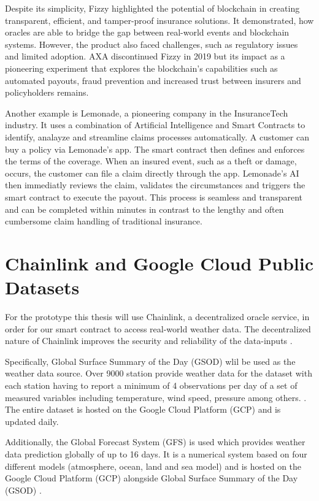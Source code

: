  Despite its simplicity, Fizzy highlighted the potential of blockchain in creating transparent, efficient, and tamper-proof insurance solutions. It demonstrated, how oracles are able to bridge the gap between real-world events and blockchain systems. However, the product also faced challenges, such as regulatory issues and limited adoption. AXA discontinued Fizzy in 2019 but its impact as a pioneering experiment that explores the blockchain's capabilities such as automated payouts, fraud prevention and increased trust between insurers and policyholders remains. \autocite{sedkaoui2021blockchain}

Another example is Lemonade, a pioneering company in the InsuranceTech industry. It uses a combination of Artificial Intelligence and Smart Contracts to identify, analayze and streamline claims processes automatically. A customer can buy a policy via Lemonade's app. The smart contract then defines and enforces the terms of the coverage. When an insured event, such as a theft or damage, occurs, the customer can file a claim directly through the app. Lemonade's AI then immediatly reviews the claim, validates the circumstances and triggers the smart contract to execute the payout. This process is seamless and transparent and can be completed within minutes in contrast to the lengthy and often cumbersome claim handling of traditional insurance. \autocite{la2023insurtech} \autocite{tardieu2020case}
 
 \section{Chainlink and Google Cloud Public Datasets}\label{section:chainlink_google_cloud_datasets}
 
 For the prototype this thesis will use Chainlink, a decentralized oracle service, in order for our smart contract to access real-world weather data. The decentralized nature of Chainlink improves the security and reliability of the data-inputs \autocite{beniiche2020study}.
 
 Specifically, Global Surface Summary of the Day (GSOD) wlil be used as the weather data source. Over 9000 station provide weather data for the dataset with each station having to report a minimum of 4 observations per day of a set of measured variables including temperature, wind speed, pressure among others. \autocite{NOAA_GSOD_2023}. The entire dataset is hosted on the Google Cloud Platform (GCP) and is updated daily.
 
 Additionally, the Global Forecast System (GFS) is used which provides weather data prediction globally of up to 16 days. It is a numerical system based on four different models (atmosphere, ocean, land and sea model) and is hosted on the Google Cloud Platform (GCP) alongside Global Surface Summary of the Day (GSOD) \autocite{NOAA_GSOD_nd}.
 
